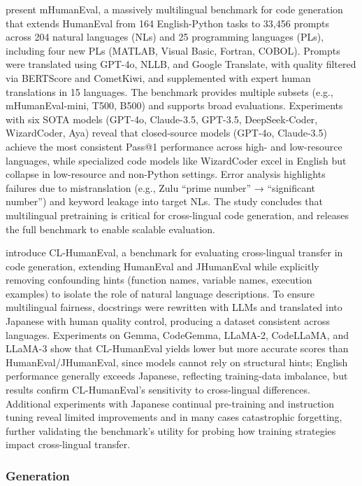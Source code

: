 \documentclass[acmsmall]{acmart}
\begin{document}
\citep{raihan-etal-2025-mhumaneval} present mHumanEval, a massively multilingual benchmark for code generation that extends HumanEval from 164 English-Python tasks to 33,456 prompts across 204 natural languages (NLs) and 25 programming languages (PLs), including four new PLs (MATLAB, Visual Basic, Fortran, COBOL). Prompts were translated using GPT-4o, NLLB, and Google Translate, with quality filtered via BERTScore and CometKiwi, and supplemented with expert human translations in 15 languages. The benchmark provides multiple subsets (e.g., mHumanEval-mini, T500, B500) and supports broad evaluations. Experiments with six SOTA models (GPT-4o, Claude-3.5, GPT-3.5, DeepSeek-Coder, WizardCoder, Aya) reveal that closed-source models (GPT-4o, Claude-3.5) achieve the most consistent Pass@1 performance across high- and low-resource languages, while specialized code models like WizardCoder excel in English but collapse in low-resource and non-Python settings. Error analysis highlights failures due to mistranslation (e.g., Zulu “prime number” → “significant number”) and keyword leakage into target NLs. The study concludes that multilingual pretraining is critical for cross-lingual code generation, and releases the full benchmark to enable scalable evaluation.


\cite{sato-etal-2024-cl} introduce CL-HumanEval, a benchmark for evaluating cross-lingual transfer in code generation, extending HumanEval and JHumanEval while explicitly removing confounding hints (function names, variable names, execution examples) to isolate the role of natural language descriptions. To ensure multilingual fairness, docstrings were rewritten with LLMs and translated into Japanese with human quality control, producing a dataset consistent across languages. Experiments on Gemma, CodeGemma, LLaMA-2, CodeLLaMA, and LLaMA-3 show that CL-HumanEval yields lower but more accurate scores than HumanEval/JHumanEval, since models cannot rely on structural hints; English performance generally exceeds Japanese, reflecting training-data imbalance, but results confirm CL-HumanEval’s sensitivity to cross-lingual differences. Additional experiments with Japanese continual pre-training and instruction tuning reveal limited improvements and in many cases catastrophic forgetting, further validating the benchmark’s utility for probing how training strategies impact cross-lingual transfer.

\subsubsection{Generation}
\noindent
\end{document}
